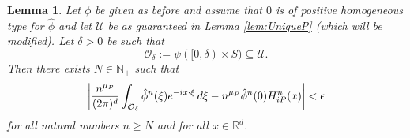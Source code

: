 \documentclass[11pt]{article}
\newtheorem{lemma}[theorem]{Lemma}
\newcommand\R{\mathbb{R}}
\newcommand{\f}[2]{\frac{#1}{#2}}
\begin{document}
\begin{lemma}\label{lem:local_1}
Let $\phi$ be given as before and assume that $0$ is of positive homogeneous type for $\hat{\phi}$ and let $\mathcal{U}$ be as guaranteed in Lemma \ref{lem:UniqueP} (which will be modified). Let $\delta>0$ be such that
\begin{equation*}
    \mathcal{O}_\delta:=\psi([0,\delta)\times S)\subseteq\mathcal{U}.
\end{equation*}
Then there exists $N \in \mathbb{N}_+$ such that 
\begin{equation*}
    \abs{\f{n^{\mu_P}}{(2\pi)^d} \int_{\mathcal{O}_\delta} \hat{\phi}^n(\xi) e^{-i x\cdot \xi} \,d\xi - n^{\mu_P}  \hat{\phi}^n(0) H_{iP}^n(x) } < \epsilon
\end{equation*}
for all natural numbers $n \geq N$ and for all $x\in \R^d$.
\end{lemma}
\end{document}
